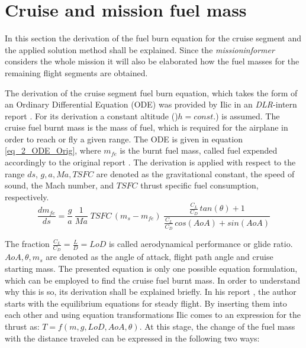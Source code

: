  
\section{Cruise and mission fuel mass}
\label{sec_Cruise_Mission_Fuel}
In this section the derivation of the fuel burn equation 
for the cruise segment and the applied solution method shall be 
explained. Since the \emph{missioninformer} considers the whole 
mission it will also be elaborated how the 
fuel masses for the remaining flight segments are 
obtained.\newline 

The derivation of the cruise segment fuel burn equation, which 
takes the form of an Ordinary Differential Equation (ODE) was provided by 
Ilic in an \emph{DLR}-intern report 
\cite{ilic_goal_2013}. For its derivation a constant altitude 
()$h = const.$) is assumed. The cruise fuel burnt 
mass is the mass of fuel, which is required for the airplane in order 
to reach or fly a given range. The ODE is given in equation \eqref{eq_2_ODE_Orig}, 
where $m_{fe}$ is the burnt fuel mass, called fuel expended accordingly 
to the original 
report \cite{ilic_goal_2013}. The derivation is applied with respect to 
the range $ds$, $g,a,Ma,TSFC$ are denoted as the gravitational constant, 
the speed of sound, the Mach number, and $TSFC$ thrust specific fuel 
consumption, respectively. 
\begin{equation}
    \label{eq_2_ODE_Orig}
        \frac{dm_{fe}}{ds} = \frac{g}{a} \: \frac{1}{Ma}\;
        TSFC\, (m_s - m_{fe}) \; \frac{\frac{C_L}{C_D}\,tan(\theta)+1}
        {\frac{C_L}{C_D}\,cos(AoA) + sin(AoA)}
\end{equation}

The fraction $\frac{C_L}{C_D} = \frac{L}{D} = LoD$ is called aerodynamical 
performance or glide ratio. $AoA, \theta, m_s$ are denoted as the 
angle of attack, flight path angle and cruise starting mass. The presented 
equation is only one possible equation formulation, which can be employed to find the 
cruise fuel burnt mass. In order to 
understand why this is so, its derivation shall be explained briefly. In 
his report \cite{ilic_goal_2013}, the author starts with the equilibrium equations 
for steady flight. By inserting them into each other and using 
equation transformations Ilic \cite{ilic_goal_2013} comes to 
an expression for the thrust as: 
$ T = f(m,g,LoD,AoA, \theta)$. At this stage, the change 
of the fuel mass with the distance traveled can be 
expressed in the following two ways: 

